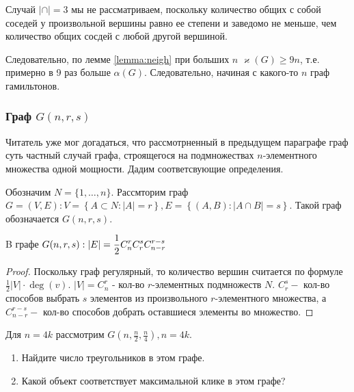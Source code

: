 \begin{note}
	Случай $ |\cap| = 3 $ мы не рассматриваем, поскольку количество общих с собой соседей у произвольной вершины равно ее степени и заведомо не меньше, чем количество общих сосдей с любой другой вершиной.
\end{note}

Следовательно, по лемме \ref{lemma:neigh} при больших $ n $  $ \varkappa(G) \geqslant 9n $, т.е. примерно в 9 раз больше $ \alpha(G) $. Следовательно, начиная с какого-то $ n $ граф гамильтонов. 

\subsubsection{Граф  $G(n, r, s)$}

Читатель уже мог догадаться, что рассмотрненный в предыдущем параграфе граф суть частный случай графа, строящегося на подмножествах $n$-элементного множества одной мощности. Дадим соответсвующие определения.

\begin{Def}
	Обозначим $ N = \{1, \ldots, n\}$. Рассмторим граф $ G = (V, E) : V = \left\lbrace A \subset N  : |A| = r \right\rbrace, E = \left\lbrace (A, B) : |A\cap B| = s\right\rbrace $. Такой граф обозначается $ G(n, r, s) $. 
\end{Def}

\begin{prop}
	 B графе $ \mathlarger {G(n, r, s) : |E|=\frac{1}{2} C_{n}^{r} C_{r}^{s} C_{n-r}^{r-s} }$
\end{prop}

\begin{proof}
	Поскольку граф регулярный, то количество вершин считается по формуле $ \frac{1}{2} |V| \cdot \deg(v)$. $|V| = C_{n}^{r}$ - кол-во $r$-элементных подмножеств $ N $. $C_{r}^{s}-$ кол-во способов
	выбрать $s$ элементов из произвольного $ r $-элементного множества, а $C_{n-r}^{r-s}-$ кол-во способов добрать оставшиеся элементы во множество.
\end{proof}


\begin{brainer}
	Для $ n = 4k $ рассмотрим $ G(n, \frac{n}{2}, \frac{n}{4}), n = 4k $.
	\begin{enumerate} \renewcommand{\theenumi}{\arabic{enumi}}
		\item Найдите число треугольников в этом графе.
		\item Какой объект соответствует максимальной клике в этом графе?
	\end{enumerate}
\end{brainer}








